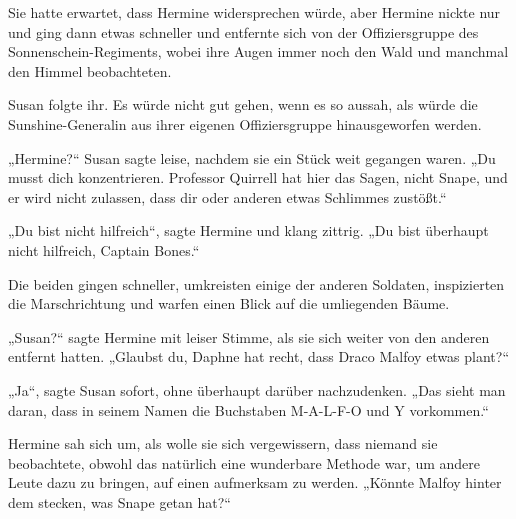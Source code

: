 Sie hatte erwartet, dass Hermine widersprechen würde, aber Hermine nickte nur und ging dann etwas schneller und entfernte sich von der Offiziersgruppe des Sonnenschein-Regiments, wobei ihre Augen immer noch den Wald und manchmal den Himmel beobachteten.

Susan folgte ihr. Es würde nicht gut gehen, wenn es so aussah, als würde die Sunshine-Generalin aus ihrer eigenen Offiziersgruppe hinausgeworfen werden.

„Hermine?“ Susan sagte leise, nachdem sie ein Stück weit gegangen waren. „Du musst dich konzentrieren. Professor Quirrell hat hier das Sagen, nicht Snape, und er wird nicht zulassen, dass dir oder anderen etwas Schlimmes zustößt.“

„Du bist nicht hilfreich“, sagte Hermine und klang zittrig. „Du bist überhaupt nicht hilfreich, Captain Bones.“

Die beiden gingen schneller, umkreisten einige der anderen Soldaten, inspizierten die Marschrichtung und warfen einen Blick auf die umliegenden Bäume.

„Susan?“ sagte Hermine mit leiser Stimme, als sie sich weiter von den anderen entfernt hatten. „Glaubst du, Daphne hat recht, dass Draco Malfoy etwas plant?“

„Ja“, sagte Susan sofort, ohne überhaupt darüber nachzudenken. „Das sieht man daran, dass in seinem Namen die Buchstaben M-A-L-F-O und Y vorkommen.“

Hermine sah sich um, als wolle sie sich vergewissern, dass niemand sie beobachtete, obwohl das natürlich eine wunderbare Methode war, um andere Leute dazu zu bringen, auf einen aufmerksam zu werden. „Könnte Malfoy hinter dem stecken, was Snape getan hat?“

